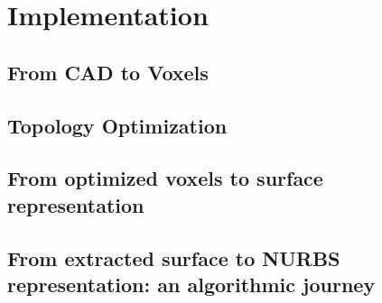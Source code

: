 %
\chapter{Implementation}
\label{chapter:software}

\section{From CAD to Voxels}



\section{Topology Optimization}


\section{From optimized voxels to surface representation}


\section{From extracted surface to NURBS representation: an algorithmic journey}



